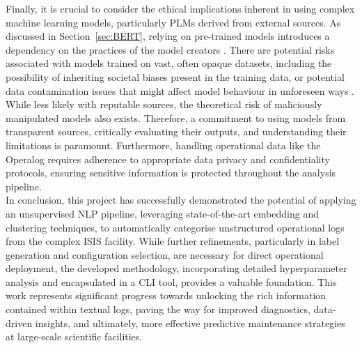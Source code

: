 \documentclass[10pt,oneside]{report}
\renewcommand{\small}{\fontsize{7}{8}\selectfont}
\begin{document}
Finally, it is crucial to consider the ethical implications inherent in using complex machine learning models, particularly PLMs derived from external sources. As discussed in Section~\ref{sec:BERT}, relying on pre-trained models introduces a dependency on the practices of the model creators \cite{wolf2019huggingface}. There are potential risks associated with models trained on vast, often opaque datasets, including the possibility of inheriting societal biases present in the training data, or potential data contamination issues that might affect model behaviour in unforeseen ways \cite{min2023recent}. While less likely with reputable sources, the theoretical risk of maliciously manipulated models also exists. Therefore, a commitment to using models from transparent sources, critically evaluating their outputs, and understanding their limitations is paramount. Furthermore, handling operational data like the Operalog requires adherence to appropriate data privacy and confidentiality protocols, ensuring sensitive information is protected throughout the analysis pipeline. \\

\noindent In conclusion, this project has successfully demonstrated the potential of applying an unsupervised NLP pipeline, leveraging state-of-the-art embedding and clustering techniques, to automatically categorise unstructured operational logs from the complex ISIS facility. While further refinements, particularly in label generation and configuration selection, are necessary for direct operational deployment, the developed methodology, incorporating detailed hyperparameter analysis and encapsulated in a CLI tool, provides a valuable foundation. This work represents significant progress towards unlocking the rich information contained within textual logs, paving the way for improved diagnostics, data-driven insights, and ultimately, more effective predictive maintenance strategies at large-scale scientific facilities.



% 
\clearpage
\begin{multicols}{2} 
\small

\end{multicols}
\end{document}
